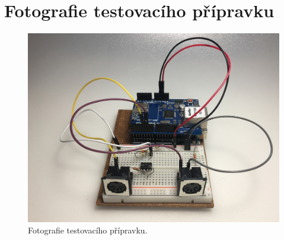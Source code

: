 \section{Fotografie testovacího přípravku}
\begin{figure}[h]
	\centering
	\includegraphics[width=.9\textwidth]{obrazky/Pripravek.jpg}
	\caption{Fotografie testovacího přípravku.}
	\label{fig:Pripravek}
\end{figure}



